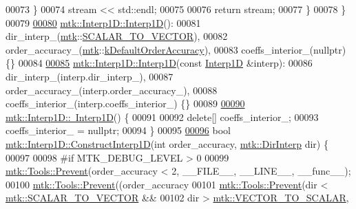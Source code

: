 \begin{DoxyCode}
00073   \}
00074   stream << std::endl;
00075 
00076   \textcolor{keywordflow}{return} stream;
00077 \}
00078 \}
00079 
\hypertarget{mtk__interp__1d_8cc_source_l00080}{}\hyperlink{classmtk_1_1Interp1D_ae56f90c53579c91c1dbe715f7e7361be}{00080} \hyperlink{classmtk_1_1Interp1D_ae56f90c53579c91c1dbe715f7e7361be}{mtk::Interp1D::Interp1D}():
00081   dir\_interp\_(\hyperlink{namespacemtk}{mtk}::\hyperlink{namespacemtk_ga674ec67bd1baa04e5dc06c2bcc351972abc9e2b8cd5a497c9f3252a792e356139}{SCALAR\_TO\_VECTOR}),
00082   order\_accuracy\_(\hyperlink{namespacemtk}{mtk}::\hyperlink{group__c01-roots_ga0d95560098eb36420511103637b6952f}{kDefaultOrderAccuracy}),
00083   coeffs\_interior\_(nullptr) \{\}
00084 
\hypertarget{mtk__interp__1d_8cc_source_l00085}{}\hyperlink{classmtk_1_1Interp1D_a92a5ed77144b3824d201a586f4072fd0}{00085} \hyperlink{classmtk_1_1Interp1D_ae56f90c53579c91c1dbe715f7e7361be}{mtk::Interp1D::Interp1D}(\textcolor{keyword}{const} \hyperlink{classmtk_1_1Interp1D}{Interp1D} &interp):
00086   dir\_interp\_(interp.dir\_interp\_),
00087   order\_accuracy\_(interp.order\_accuracy\_),
00088   coeffs\_interior\_(interp.coeffs\_interior\_) \{\}
00089 
\hypertarget{mtk__interp__1d_8cc_source_l00090}{}\hyperlink{classmtk_1_1Interp1D_a52ea06b5e3d7082eb06ade256f4e30fb}{00090} \hyperlink{classmtk_1_1Interp1D_a52ea06b5e3d7082eb06ade256f4e30fb}{mtk::Interp1D::~Interp1D}() \{
00091 
00092   \textcolor{keyword}{delete}[] coeffs\_interior\_;
00093   coeffs\_interior\_ = \textcolor{keyword}{nullptr};
00094 \}
00095 
\hypertarget{mtk__interp__1d_8cc_source_l00096}{}\hyperlink{classmtk_1_1Interp1D_ab1c8e12534886aa185b24be474d1056e}{00096} \textcolor{keywordtype}{bool} \hyperlink{classmtk_1_1Interp1D_ab1c8e12534886aa185b24be474d1056e}{mtk::Interp1D::ConstructInterp1D}(\textcolor{keywordtype}{int} order\_accuracy, 
      \hyperlink{group__c02-enums_ga674ec67bd1baa04e5dc06c2bcc351972}{mtk::DirInterp} dir) \{
00097 
00098 \textcolor{preprocessor}{  #if MTK\_DEBUG\_LEVEL > 0}
00099   \hyperlink{classmtk_1_1Tools_afe5bb096309258e2e72503fd7b41c7e0}{mtk::Tools::Prevent}(order\_accuracy < 2, \_\_FILE\_\_, \_\_LINE\_\_, \_\_func\_\_);
00100   \hyperlink{classmtk_1_1Tools_afe5bb096309258e2e72503fd7b41c7e0}{mtk::Tools::Prevent}((order\_accuracy%
00101   \hyperlink{classmtk_1_1Tools_afe5bb096309258e2e72503fd7b41c7e0}{mtk::Tools::Prevent}(dir < \hyperlink{namespacemtk_ga674ec67bd1baa04e5dc06c2bcc351972abc9e2b8cd5a497c9f3252a792e356139}{mtk::SCALAR\_TO\_VECTOR} &&
00102                       dir > \hyperlink{namespacemtk_ga674ec67bd1baa04e5dc06c2bcc351972a122cf2e24aef105e9214698206af6904}{mtk::VECTOR\_TO\_SCALAR},

\end{DoxyCode}
